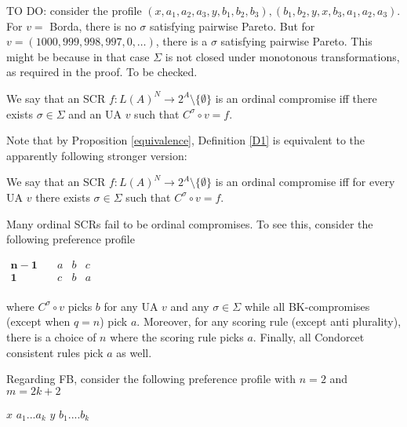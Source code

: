 \documentclass[version=3.21, pagesize, notitlepage, twoside=off, bibliography=totoc, DIV=calc, fontsize=12pt, a4paper]{scrartcl}
\begin{document}
TO DO: consider the profile $(x, a_1, a_2, a_3, y, b_1, b_2, b_3), (b_1, b_2, y, x, b_3, a_1, a_2, a_3)$. For $v = $ Borda, there is no $\sigma$ satisfying pairwise Pareto. But for $v = (1000, 999, 998, 997, 0, …)$, there is a $\sigma$ satisfying pairwise Pareto. This might be because in that case $\Sigma$ is not closed under monotonous transformations, as required in the proof. To be checked.

\begin{definition}
\label{D1} \bigskip We say that an SCR $f:L(A)^{N}\rightarrow 2^{A} \setminus \{\emptyset \}$ is an ordinal compromise iff there exists $\sigma \in \Sigma $ and an UA $v$ such that $C^{\sigma }\circ v=f$.
\end{definition}

Note that by Proposition \ref{equivalence}, Definition \ref{D1} is equivalent to the apparently following stronger version:

\begin{definition}
\label{D2} We say that an SCR $f:L(A)^{N}\rightarrow 2^{A} \setminus \{\emptyset \}$ is an ordinal compromise iff for every UA $v$ there exists $\sigma \in \Sigma $ such that $C^{\sigma }\circ v=f$.
\end{definition}

\begin{example}
	\label{ex:qeqn}
Many ordinal SCRs fail to be ordinal compromises. To see this, consider the following preference profile

\begin{center}
	$
	\begin{array}{cccc}
	\mathbf{n-1} \quad &a&b&c\\
	\mathbf{1} \quad &c&b&a\\
	\end{array}
	$
\end{center}

where $C^{\sigma }\circ v$ picks $b$ for any UA $v$ and any $\sigma \in \Sigma $ while all BK-compromises (except when $q=n$) pick $a$. Moreover, for any scoring rule (except anti plurality), there is a choice of $n$ where the scoring rule picks $a$. Finally, all Condorcet consistent rules pick $a$ as well.
\end{example}

Regarding FB, consider the following preference profile with $n=2$ and $m=2k+2$

\bigskip

$x$ $a_{1}...a_{k}$ $y$ $b_{1}....b_{k}$
\end{document}
